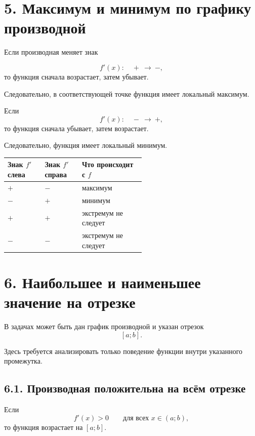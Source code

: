 \documentclass[a4paper,12pt]{article}
\begin{document}
\section*{5. Максимум и минимум по графику производной}

Если производная меняет знак

\[
f'(x):
\quad
+\ \longrightarrow\ -,
\]
то функция сначала возрастает, затем убывает.

Следовательно, в соответствующей точке функция имеет локальный максимум.

Если
\[
f'(x):
\quad
-\ \longrightarrow\ +,
\]
то функция сначала убывает, затем возрастает.

Следовательно, функция имеет локальный минимум.

\begin{center}
\renewcommand{\arraystretch}{1.5}
\begin{tabularx}{0.92\linewidth}{>{\centering\arraybackslash}p{0.27\linewidth}
>{\centering\arraybackslash}p{0.27\linewidth}
>{\centering\arraybackslash}X}
\toprule
Знак \(f'\) слева & Знак \(f'\) справа & Что происходит с \(f\) \\
\midrule
\( + \) & \( - \) & максимум \\
\( - \) & \( + \) & минимум \\
\( + \) & \( + \) & экстремум не следует \\
\( - \) & \( - \) & экстремум не следует \\
\bottomrule
\end{tabularx}
\end{center}

\section*{6. Наибольшее и наименьшее значение на отрезке}

В задачах может быть дан график производной и указан отрезок
\[
[a;b].
\]

Здесь требуется анализировать только поведение функции внутри указанного промежутка.

\subsection*{6.1. Производная положительна на всём отрезке}

Если
\[
f'(x)>0
\qquad
\text{для всех }x\in(a;b),
\]
то функция возрастает на \([a;b]\).
\end{document}
